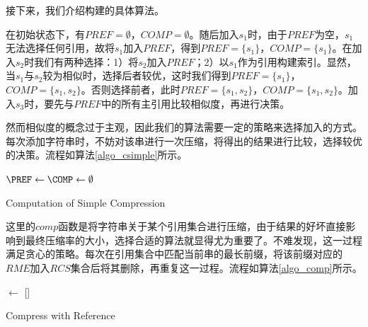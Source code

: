 ﻿\documentclass{sysuthesis}
\begin{document}
接下来，我们介绍构建的具体算法。\par
在初始状态下，有$PREF = \emptyset$，$COMP = \emptyset$。随后加入$s_{1}$时，由于$PREF$为空，$s_{1}$无法选择任何引用，故将$s_{1}$加入$PREF$，得到$PREF = \{s_{1}\}$，$COMP = \{s_{1}\}$。在加入$s_{2}$时我们有两种选择：1）将$s_{2}$加入$PREF$；2）以$s_{1}$作为引用构建索引。显然，当$s_{1}$与$s_{2}$较为相似时，选择后者较优，这时我们得到$PREF = \{s_{1}\}$，$COMP = \{s_{1}, s_{2}\}$。否则选择前者，此时$PREF = \{s_{1}, s_{2}\}$，$COMP = \{s_{1}, s_{2}\}$。加入$s_{3}$时，要先与$PREF$中的所有主引用比较相似度，再进行决策。\par
然而相似度的概念过于主观，因此我们的算法需要一定的策略来选择加入的方式。每次添加字符串时，不妨对该串进行一次压缩，将得出的结果进行比较，选择较优的决策。流程如算法\ref{algo_csimple}所示。\par

\begin{algorithm}[H]
	\Output{\PREF, \COMP}
	$\PREF \leftarrow \COMP \leftarrow \emptyset$\;
	\caption{Computation of Simple Compression}\label{algo_csimple}
\end{algorithm}

这里的$comp$函数是将字符串关于某个引用集合进行压缩，由于结果的好坏直接影响到最终压缩率的大小，选择合适的算法就显得尤为重要了。不难发现，这一过程满足贪心的策略。每次在引用集合中匹配当前串的最长前缀，将该前缀对应的$RME$加入$RCS$集合后将其删除，再重复这一过程。流程如算法\ref{algo_comp}所示。\par

\begin{algorithm}[H]
	\rcs $\leftarrow$ []\;
	\caption{Compress with Reference}\label{algo_comp}
\end{algorithm}
\end{document}
